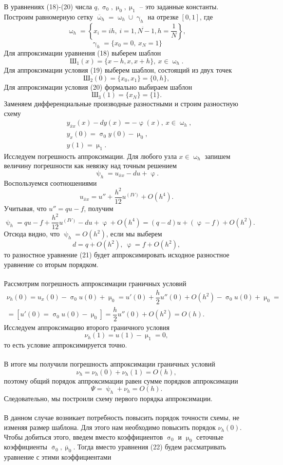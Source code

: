 \documentclass[a4paper, 12pt]{report}
\numberwithin{equation}{section}
\newcommand{\ol}{\overline}
\renewcommand{\gamma}{\upgamma}
\renewcommand{\varphi}{\upvarphi}
\renewcommand{\sigma}{\upsigma}
\renewcommand{\psi}{\uppsi}
\renewcommand{\mu}{\upmu}
\renewcommand{\omega}{\upomega}
\begin{document}
В уравнениях (18)-(20) числа $q, \sigma_0, \mu_0, \mu_1$ -- это заданные константы. Построим равномерную сетку $\ol \omega_h = \omega_h \cup \gamma_h$ на отрезке $[0,1]$, где
$$\omega_h = \left\{x_i = ih,\ i = \ol {1,N-1}, h = \dfrac1N\right\},$$
$$\gamma_h = \{x_0=0,\ x_N=1\}$$
Для аппроксимации уравнения (18) выберем шаблон $$\text{Ш}_1(x) = \{x-h, x, x+h\},\ x \in \omega_h.$$
Для аппроксимации условия (19) выберем шаблон, состоящий из двух точек
$$\text{Ш}_2(0) = \{x_0, x_1\} = \{0,h\},$$
Для аппроксимации условия (20) формально выбираем шаблон
$$\text{Ш}_3(1) = \{x_N\} = \{1\}.$$
Заменяем дифференциальные производные разностными и строим разностную схему
\begin{align}
	&y_{\ol x x}(x) - dy(x) = -\varphi(x),\ x\in \omega_h,\\
	&y_x(0) = \sigma_0 y(0) - \mu_0,\\
	&y(1) = \mu_1.
\end{align}
Исследуем погрешность аппроксимации. Для любого узла $x \in \omega_h$ запишем величину погрешности как невязку над точным решением
$$\psi_h = u_{\ol x x} - du + \varphi.$$
Воспользуемся соотношениями
$$u_{\ol x x} = u'' + \dfrac{h^2}{12}u^{(IV)} + O(h^4).$$
Учитывая, что $u'' = qu - f$, получим
$$\psi_h = qu - f + \dfrac{h^2}{12}u^{(IV)} - du + \varphi + O(h^4) = (q-d)u + (\varphi - f) + O(h^2).$$
Отсюда видно, что $\psi_h = O(h^2)$, если мы выберем
$$d = q+ O(h^2),\ \varphi = f + O(h^2),$$ то разностное уравнение (21) будет аппроксимировать исходное разностное уравнение со вторым порядком. \\\\
Рассмотрим погрешность аппроксимации граничных условий
\begin{multline*}
	\nu_h(0) = u_x(0) - \sigma_0 u(0) + \mu_0 = u'(0) + \dfrac h2 u''(0) + O(h^2) - \sigma_0 u(0) + \mu_0 =\\= [u'(0) =\sigma_0 u(0) - \mu_0] = \dfrac{h}{2}u''(0) + O(h^2) = O(h).
\end{multline*}
Исследуем аппроксимацию второго граничного условия
$$\nu_h(1) = u(1) - \mu_1 = 0,$$
то есть условие аппроксимируется точно.\\\\
В итоге мы получили погрешность аппроксимации граничных условий
$$\nu_h = \nu_h(0) + \nu_h(1) = O(h),$$ поэтому общий порядок аппроксимации равен сумме порядков аппроксимации
$$\Psi = \psi_h + \nu_h = O(h).$$
Следовательно, мы построили схему первого порядка аппроксимации.\\\\
В данном случае возникает потребность повысить порядок точности схемы, не изменяя размер шаблона. Для этого нам необходимо повысить порядок $\nu_h(0)$. Чтобы добиться этого, введем вместо коэффициентов $\sigma_0$ и $\mu_0$ сеточные коэффициенты $\ol \sigma_0, \ol \mu _0$. Тогда вместо уравнения (22) будем рассматривать уравнение с этими коэффициентами
\end{document}
